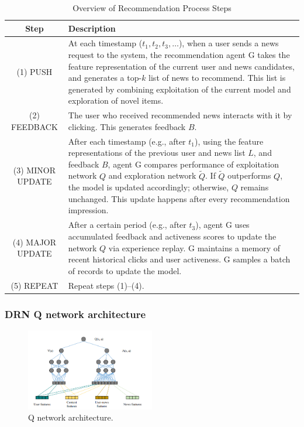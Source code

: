 \documentclass{ieeetj}
\begin{document}
\begin{table}[ht]
    \centering
    \caption{Overview of Recommendation Process Steps}
    \begin{tabularx}{\columnwidth}{|c|X|}
        \hline
        \textbf{Step} & \textbf{Description} \\ \hline
        (1) PUSH & At each timestamp ($t_1, t_2, t_3, \dots$), when a user sends a news request to the system, the recommendation agent G takes the feature representation of the current user and news candidates, and generates a top-$k$ list of news to recommend. This list is generated by combining exploitation of the current model and exploration of novel items. \\ \hline
        (2) FEEDBACK & The user who received recommended news interacts with it by clicking. This generates feedback $B$. \\ \hline
        (3) MINOR UPDATE & After each timestamp (e.g., after $t_1$), using the feature representations of the previous user and news list $L$, and feedback $B$, agent G compares performance of exploitation network $Q$ and exploration network $\widetilde{Q}$. If $\widetilde{Q}$ outperforms $Q$, the model is updated accordingly; otherwise, $Q$ remains unchanged. This update happens after every recommendation impression. \\ \hline
        (4) MAJOR UPDATE & After a certain period (e.g., after $t_3$), agent G uses accumulated feedback and activeness scores to update the network $Q$ via experience replay. G maintains a memory of recent historical clicks and user activeness. G samples a batch of records to update the model. \\ \hline
        (5) REPEAT & Repeat steps (1)–(4). \\ \hline
    \end{tabularx}
    \label{tab:recommendation-process}
\end{table}

\FloatBarrier
\subsubsection{DRN Q network architecture}

\begin{figure}[h]
	\centering
	\includegraphics[width=0.5\textwidth]{figures/drn-q-architecture.png}
	\caption{Q network architecture.}
	\label{fig:drl-q}
\end{figure}
\end{document}
